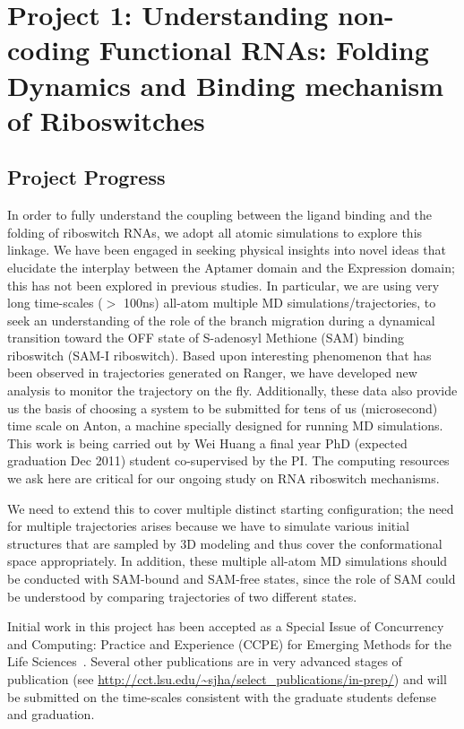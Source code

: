 \documentclass[a4paper,11pt]{article}
\begin{document}
\section{Project 1: Understanding non-coding Functional RNAs: 
Folding Dynamics and Binding mechanism of Riboswitches}

\subsection{Project Progress}
In order to fully understand the coupling between the ligand binding
and the folding of riboswitch RNAs, we adopt all atomic simulations to
explore this linkage.  We have been engaged in seeking physical
insights into novel ideas that elucidate the interplay between the
Aptamer domain and the Expression domain; this has not been explored
in previous studies.  In particular, we are using very long
time-scales ($>$ 100ns) all-atom multiple MD simulations/trajectories,
to seek an understanding of the role of the branch migration during a
dynamical transition toward the OFF state of S-adenosyl Methione (SAM)
binding riboswitch (SAM-I riboswitch).  Based upon interesting
phenomenon that has been observed in trajectories generated on Ranger,
we have developed new analysis to monitor the trajectory on the
fly. Additionally, these data also provide us the basis of choosing a
system to be submitted for tens of us (microsecond) time scale on
Anton, a machine specially designed for running MD simulations. This
work is being carried out by Wei Huang a final year PhD (expected
graduation Dec 2011) student co-supervised by the PI.  The computing
resources we ask here are critical for our ongoing study on RNA
riboswitch mechanisms.

We need to extend this to cover multiple distinct starting configuration; the need for multiple trajectories arises because we have to simulate various initial structures that are sampled by 3D modeling and thus cover the conformational space appropriately.  In addition, these multiple all-atom MD simulations should be conducted with SAM-bound and SAM-free states, since the role of SAM could be understood by comparing trajectories of two different states.

Initial work in this project has been accepted as a Special Issue of Concurrency and Computing: Practice and Experience (CCPE) for Emerging Methods for the Life Sciences~\cite{ecmls_ccpe10}.  Several other publications are in very advanced stages of publication (see \url{http://cct.lsu.edu/~sjha/select_publications/in-prep/}) and will be submitted on the time-scales consistent with the graduate students defense and graduation.
\end{document}
